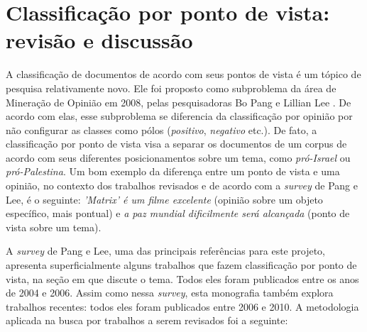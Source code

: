 \chapter{Classificação por ponto de vista: revisão e discussão}
\label{chap3}

A classificação de documentos de acordo com seus pontos de vista é um tópico de pesquisa relativamente novo. Ele foi proposto como subproblema da área de Mineração de Opinião em 2008, pelas pesquisadoras Bo Pang e Lillian Lee \cite{omsa}. De acordo com elas, esse subproblema se diferencia da classificação por opinião por não configurar as classes como pólos (\emph{positivo}, \emph{negativo} etc.). De fato, a classificação por ponto de vista visa a separar os documentos de um corpus de acordo com seus diferentes posicionamentos sobre um tema, como \emph{pró-Israel} ou \emph{pró-Palestina}. Um bom exemplo da diferença entre um ponto de vista e uma opinião, no contexto dos trabalhos revisados e de acordo com a \emph{survey} de Pang e Lee, é o seguinte: \emph{'Matrix' é um filme excelente} (opinião sobre um objeto específico, mais pontual) e \emph{a paz mundial dificilmente será alcançada} (ponto de vista sobre um tema). %

A \emph{survey} de Pang e Lee, uma das principais referências para este projeto, apresenta superficialmente alguns trabalhos que fazem classificação por ponto de vista, na seção em que discute o tema. Todos eles foram publicados entre os anos de 2004 e 2006. Assim como nessa \emph{survey}, esta monografia também explora trabalhos recentes: todos eles foram publicados entre 2006 e 2010. A metodologia aplicada na busca por trabalhos a serem revisados foi a seguinte: %

